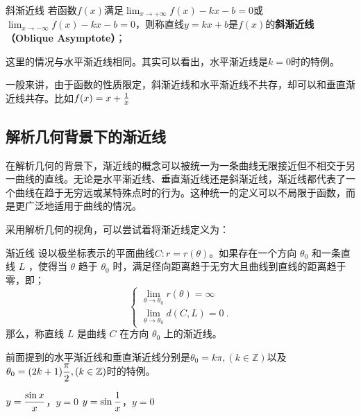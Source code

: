 \begin{definition}{斜渐近线}
若函数$f(x)$满足$\displaystyle \lim_{x\to +\infty}f(x)-kx-b=0$或$\displaystyle \lim_{x\to -\infty}f(x)-kx-b=0$，则称直线$y=kx+b$是$f(x)$的\textbf{斜渐近线（Oblique Asymptote）}；
\end{definition}

这里的情况与水平渐近线相同。其实可以看出，水平渐近线是$k=0$时的特例。

一般来讲，由于函数的性质限定，斜渐近线和水平渐近线不共存，却可以和垂直渐近线共存。比如$f(x)=x+{1\over x}$

\subsection{解析几何背景下的渐近线}

在解析几何的背景下，渐近线的概念可以被统一为一条曲线无限接近但不相交于另一曲线的直线。无论是水平渐近线、垂直渐近线还是斜渐近线，渐近线都代表了一个曲线在趋于无穷远或某特殊点时的行为。这种统一的定义可以不局限于函数，而是更广泛地适用于曲线的情况。

采用解析几何的视角，可以尝试着将渐近线定义为：

\begin{definition}{渐近线}
设以极坐标表示的平面曲线$C:r=r(\theta)$。如果存在一个方向  $\theta_0$  和一条直线  $L$ ，使得当  $\theta$  趋于  $\theta_0$  时，满足径向距离趋于无穷大且曲线到直线的距离趋于零，即；
\begin{equation}
\begin{cases}
\displaystyle\lim_{\theta \to \theta_0} r(\theta) = \infty\\
\displaystyle\lim_{\theta \to \theta_0} d(C, L) = 0~.
\end{cases}
\end{equation}
那么，称直线  $L$  是曲线  $C$  在方向  $\theta_0$  上的渐近线。
\end{definition}

前面提到的水平渐近线和垂直渐近线分别是$\theta_0=k\pi,(k\in\mathbb{Z})$以及$\displaystyle\theta_0=(2k+1){\pi\over2},(k\in\mathbb{Z})$时的特例。

$\displaystyle y={\sin x\over x}$，$y=0$
$\displaystyle y=\sin {1\over x}$，$y=0$